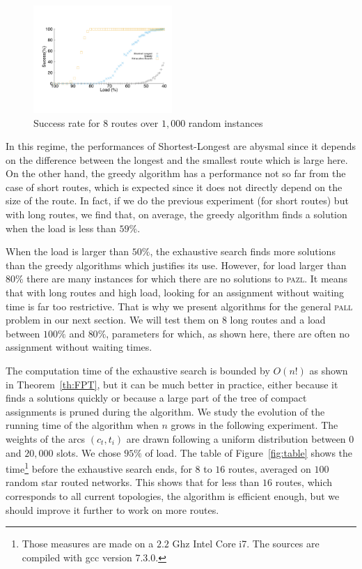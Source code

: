 \documentclass[10pt, conference, letterpaper]{IEEEtran}
\newcommand\pazl{\textsc{pazl}\xspace}
\newcommand\pall{\textsc{pall}\xspace}
\begin{document}
\begin{figure}[h]

       \begin{center}
      \includegraphics[width=0.47\textwidth]{echec_longues.pdf}
      \end{center}
       
      \caption{Success rate for $8$ routes over $1,000$ random instances}\label{fig:long}
     \end{figure}
      
      In this regime, the performances of Shortest-Longest are abysmal since it depends on the difference between the longest and the smallest route which is large here. On the other hand, the greedy algorithm has a performance not so far from the case of short routes, which is expected since it does not directly depend on the size of the route. In fact, if we do the previous experiment  (for short routes) but with long routes, we find that, on average, the greedy algorithm finds a solution when the load is less than $59\%$.
      
      When the load is larger than $50\%$, the exhaustive search finds more solutions than the greedy algorithms which justifies its use. However, for load larger than $80\%$ there are many instances for which there are no solutions to \pazl.
      It means that with long routes and high load, looking for an assignment without waiting time is far too restrictive. That is why we present algorithms for the general \pall problem in our next section. We will test them on $8$ long routes and a load between $100\%$ and $80\%$, parameters for which, as shown here, there are often no assignment without waiting times.
      
      The computation time of the exhaustive search is bounded by $O(n!)$ as shown in Theorem~\ref{th:FPT}, 
      but it can be much better in practice, either because it finds a solutions quickly or because a large part of the tree of 
      compact assignments is pruned during the algorithm. We study the evolution of the running time  of the algorithm when $n$ grows in the following experiment. The weights of the arcs $(c_t,t_i)$ are drawn following a uniform distribution between $0$ and $20,000$ slots. We chose  $95\%$ of load.  The table of Figure~\ref{fig:table} shows the time\footnote{Those measures are made on a $2.2$ Ghz Intel Core i7. The sources are compiled with gcc version 7.3.0.}  before the exhaustive search ends, for $8$ to $16$ routes, averaged on $100$ random star routed networks. This shows that for less than $16$ routes, which corresponds to all current topologies, the algorithm is efficient enough, but we should improve it further to work on more routes.
      
\end{document}
